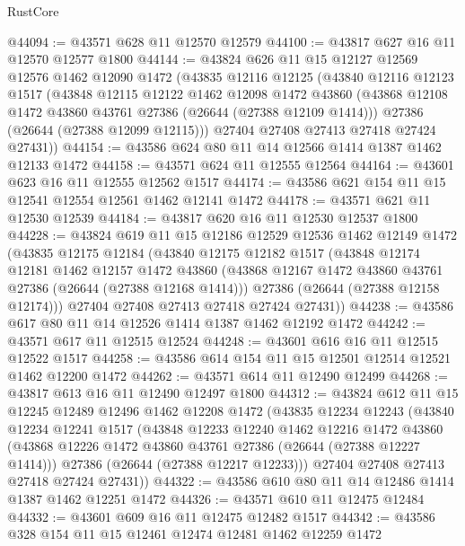 \begin{lexlean}{RustCore}
\begin{coremodule}
@44094 := @43571 @628 @11 @12570 @12579
@44100 := @43817 @627 @16 @11 @12570 @12577 @1800
@44144 := @43824
    @626
    @11
    @15
    @12127
    @12569
    @12576
    @1462
    @12090
    @1472
    (@43835
      @12116
      @12125
      (@43840
        @12116
        @12123
        @1517
        (@43848
          @12115
          @12122
          @1462
          @12098
          @1472
          @43860
          (@43868 @12108 @1472 @43860 @43761 @27386 (@26644 (@27388 @12109 @1414)))
          @27386
          (@26644 (@27388 @12099 @12115)))
        @27404
        @27408
        @27413
        @27418
        @27424
        @27431))
@44154 := @43586 @624 @80 @11 @14 @12566 @1414 @1387 @1462 @12133 @1472
@44158 := @43571 @624 @11 @12555 @12564
@44164 := @43601 @623 @16 @11 @12555 @12562 @1517
@44174 := @43586 @621 @154 @11 @15 @12541 @12554 @12561 @1462 @12141 @1472
@44178 := @43571 @621 @11 @12530 @12539
@44184 := @43817 @620 @16 @11 @12530 @12537 @1800
@44228 := @43824
    @619
    @11
    @15
    @12186
    @12529
    @12536
    @1462
    @12149
    @1472
    (@43835
      @12175
      @12184
      (@43840
        @12175
        @12182
        @1517
        (@43848
          @12174
          @12181
          @1462
          @12157
          @1472
          @43860
          (@43868 @12167 @1472 @43860 @43761 @27386 (@26644 (@27388 @12168 @1414)))
          @27386
          (@26644 (@27388 @12158 @12174)))
        @27404
        @27408
        @27413
        @27418
        @27424
        @27431))
@44238 := @43586 @617 @80 @11 @14 @12526 @1414 @1387 @1462 @12192 @1472
@44242 := @43571 @617 @11 @12515 @12524
@44248 := @43601 @616 @16 @11 @12515 @12522 @1517
@44258 := @43586 @614 @154 @11 @15 @12501 @12514 @12521 @1462 @12200 @1472
@44262 := @43571 @614 @11 @12490 @12499
@44268 := @43817 @613 @16 @11 @12490 @12497 @1800
@44312 := @43824
    @612
    @11
    @15
    @12245
    @12489
    @12496
    @1462
    @12208
    @1472
    (@43835
      @12234
      @12243
      (@43840
        @12234
        @12241
        @1517
        (@43848
          @12233
          @12240
          @1462
          @12216
          @1472
          @43860
          (@43868 @12226 @1472 @43860 @43761 @27386 (@26644 (@27388 @12227 @1414)))
          @27386
          (@26644 (@27388 @12217 @12233)))
        @27404
        @27408
        @27413
        @27418
        @27424
        @27431))
@44322 := @43586 @610 @80 @11 @14 @12486 @1414 @1387 @1462 @12251 @1472
@44326 := @43571 @610 @11 @12475 @12484
@44332 := @43601 @609 @16 @11 @12475 @12482 @1517
@44342 := @43586 @328 @154 @11 @15 @12461 @12474 @12481 @1462 @12259 @1472

\end{coremodule}
\end{lexlean}
